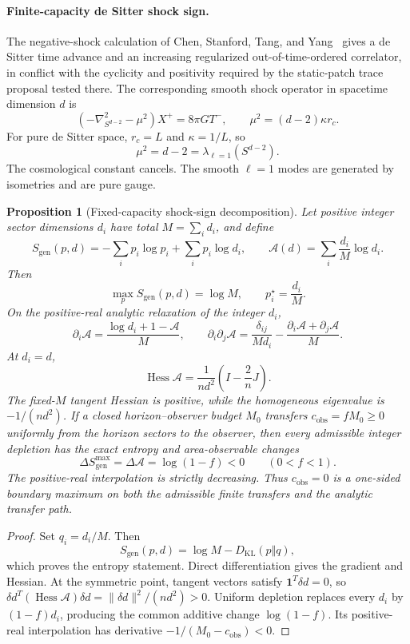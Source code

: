 \documentclass[11pt]{article}
\newtheorem{proposition}[theorem]{Proposition}
\begin{document}
\paragraph{Finite-capacity de Sitter shock sign.}
The negative-shock calculation of Chen, Stanford, Tang, and
Yang~\cite{chenStanfordTangYang2026} gives a de Sitter time advance and an
increasing regularized out-of-time-ordered correlator, in conflict with the
cyclicity and positivity required by the static-patch trace proposal tested
there. The corresponding smooth shock operator in spacetime dimension \(d\)
is
\[
\left(-\nabla^2_{S^{d-2}}-\mu^2\right)X^+=8\pi G T^-,
\qquad
\mu^2=(d-2)\kappa r_c.
\]
For pure de Sitter space, \(r_c=L\) and \(\kappa=1/L\), so
\[
\mu^2=d-2=\lambda_{\ell=1}(S^{d-2}).
\]
The cosmological constant cancels. The smooth \(\ell=1\) modes are generated
by isometries and are pure gauge.

\begin{proposition}[Fixed-capacity shock-sign decomposition]
\label{prop:fixed-capacity-shock-sign}
Let positive integer sector dimensions \(d_i\) have total
\(M=\sum_i d_i\), and define
\[
S_{\mathrm{gen}}(p,d)
=-\sum_i p_i\log p_i+\sum_i p_i\log d_i,
\qquad
\mathcal A(d)=\sum_i\frac{d_i}{M}\log d_i.
\]
Then
\[
\max_p S_{\mathrm{gen}}(p,d)=\log M,
\qquad
p_i^\star=\frac{d_i}{M}.
\]
On the positive-real analytic relaxation of the integer \(d_i\),
\[
\partial_i\mathcal A
=\frac{\log d_i+1-\mathcal A}{M},
\qquad
\partial_i\partial_j\mathcal A
=\frac{\delta_{ij}}{Md_i}
-\frac{\partial_i\mathcal A+\partial_j\mathcal A}{M}.
\]
At \(d_i=d\),
\[
\operatorname{Hess}\mathcal A
=\frac1{nd^2}\left(I-\frac2nJ\right).
\]
The fixed-\(M\) tangent Hessian is positive, while the homogeneous eigenvalue
is \(-1/(nd^2)\). If a closed horizon--observer budget \(M_0\) transfers
\(c_{\mathrm{obs}}=fM_0\geq0\) uniformly from the horizon sectors to the
observer, then every admissible integer depletion has the exact entropy and
area-observable changes
\[
\Delta S_{\mathrm{gen}}^{\max}
=\Delta\mathcal A
=\log(1-f)<0
\qquad(0<f<1).
\]
The positive-real interpolation is strictly decreasing. Thus
\(c_{\mathrm{obs}}=0\) is a one-sided boundary maximum on both the admissible
finite transfers and the analytic transfer path.
\end{proposition}

\begin{proof}
Set \(q_i=d_i/M\). Then
\[
S_{\mathrm{gen}}(p,d)=\log M-D_{\mathrm{KL}}(p\Vert q),
\]
which proves the entropy statement. Direct differentiation gives the
gradient and Hessian. At the symmetric point, tangent vectors satisfy
\(\mathbf1^T\delta d=0\), so
\(\delta d^T(\operatorname{Hess}\mathcal A)\delta d=\|\delta d\|^2/(nd^2)>0\).
Uniform depletion replaces every \(d_i\) by \((1-f)d_i\), producing the
common additive change \(\log(1-f)\). Its positive-real interpolation has
derivative \(-1/(M_0-c_{\mathrm{obs}})<0\).
\end{proof}
\end{document}

